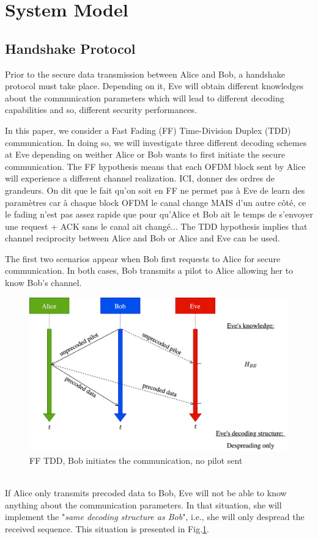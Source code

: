\documentclass[journal,comsoc]{IEEEtran}
\let\MYoriglatexcaption\caption
\renewcommand{\caption}[2][\relax]{\MYoriglatexcaption[#2]{#2}}
\begin{document}
\section{System Model}\label{sec:system-model}

\subsection{Handshake Protocol}
\label{sec:establishment}
Prior to the secure data transmission between Alice and Bob, a handshake protocol must take place. Depending on it, Eve will obtain different knowledges about the communication parameters which will lead to different decoding capabilities and so, different security performances. 

In this paper, we consider a Fast Fading (FF) Time-Division Duplex (TDD) communication. In doing so, we will investigate three different decoding schemes at Eve depending on weither Alice or Bob wants to first initiate the secure communication. The FF hypothesis means that each OFDM block sent by Alice will experience a different channel realization. {\color{red}ICI, donner des ordres de grandeurs. On dit que le fait qu'on soit en FF ne permet pas à Eve de learn des paramètres car à chaque block OFDM le canal change MAIS d'un autre côté, ce le fading n'est pas assez rapide que pour qu'Alice et Bob ait le temps de s'envoyer une request + ACK sans le canal ait changé...} The TDD hypothesis implies that channel reciprocity between Alice and Bob or Alice and Eve can be used. 

The first two scenarios appear when Bob first requests to Alice for secure communication. In both cases, Bob transmits a pilot to Alice allowing her to know Bob's channel. \\
\begin{figure}[!ht]
	\centering
	\includegraphics[width=.9\linewidth]{graphs/diagram_sequence-FF_TDD_B_no_pilot.jpg}
	\caption{FF TDD, Bob initiates the communication, no pilot sent}
	\label{fig_ff_tdd_b_no_pilot}
\end{figure} \\
If Alice only transmits precoded data to Bob, Eve will not be able to know anything about the communication parameters. In that situation, she will implement the "\textit{same decoding structure as Bob}", i.e., she will only despread the received sequence. This situation is presented in Fig.\ref{fig_ff_tdd_b_no_pilot}.
\end{document}
